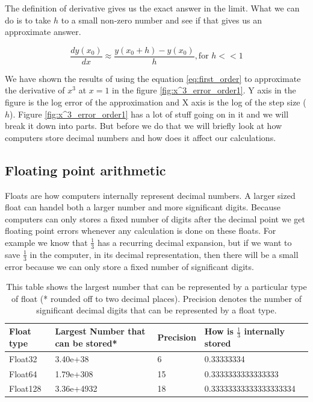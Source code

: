 The definition of derivative gives us the exact answer in the limit. What we can do is to take $h$ to a small non-zero number and see if that gives us an approximate answer.

\begin{equation}
    \frac{dy(x_0)}{dx} \approx \frac{y(x_0 + h) - y(x_0)}{h} , \text{for } h << 1
    \label{eq:first_order}
\end{equation}

We have shown the results of using the equation \ref{eq:first_order} to approximate the derivative of $x^3$ at $x=1$ in the figure \ref{fig:x^3_error_order1}. Y axis in the figure is the log error of the approximation and X axis is the log of the  step size ($h$). Figure \ref{fig:x^3_error_order1} has a lot of stuff going on in it and we will break it down into parts. But before we do that we will briefly look at how computers store decimal numbers and how does it affect our calculations.

\subsection{Floating point arithmetic}

 Floats are how computers internally represent decimal numbers. A larger sized float can handel both a larger number and more significant digits. Because computers can only stores a fixed number of digits after the decimal point we get  floating point errors whenever any calculation is done on these floats. For example we know that $\frac{1}{3}$ has a recurring decimal expansion, but if we want to save $\frac{1}{3}$ in the computer, in its decimal representation, then there will be a small error because we can only store a fixed number of significant digits.




\begin{table}[hbt!]
    \centering
    \begin{tabular}{||m{2cm} | m{3.2cm} | m{1.5cm} | m{4.5cm}||}
        \hline
        Float type & Largest Number that can be stored* & Precision & How is $\frac{1}{3}$ internally stored \\ [0.5ex]
        \hline\hline

        Float32    & 3.40e+38                           & 6         & 0.33333334                             \\

        Float64    & 1.79e+308                          & 15        & 0.3333333333333333                     \\

        Float128   & 3.36e+4932                         & 18        & 0.33333333333333333334                 \\ [1ex]
        \hline
    \end{tabular}
    \caption{This table shows the largest number that can be represented by a particular type of float (* rounded off to two decimal places). Precision denotes the number of significant decimal digits that can be represented by a float type.}
    \label{table:floats}
\end{table}

